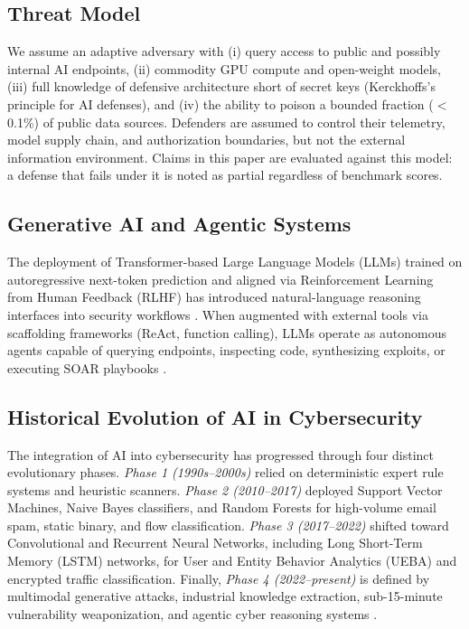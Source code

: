 \documentclass[conference,10pt,twocolumn,a4paper]{IEEEtran}
\begin{document}
\subsection{Threat Model}
We assume an adaptive adversary with (i) query access to public and possibly internal AI endpoints, (ii) commodity GPU compute and open-weight models, (iii) full knowledge of defensive architecture short of secret keys (Kerckhoffs's principle for AI defenses), and (iv) the ability to poison a bounded fraction ($<$0.1\%) of public data sources. Defenders are assumed to control their telemetry, model supply chain, and authorization boundaries, but not the external information environment. Claims in this paper are evaluated against this model: a defense that fails under it is noted as partial regardless of benchmark scores.

\subsection{Generative AI and Agentic Systems}
The deployment of Transformer-based Large Language Models (LLMs) trained on autoregressive next-token prediction and aligned via Reinforcement Learning from Human Feedback (RLHF) has introduced natural-language reasoning interfaces into security workflows \cite{enisa_frontier_2026, hines2026securing}. When augmented with external tools via scaffolding frameworks (ReAct, function calling), LLMs operate as autonomous agents capable of querying endpoints, inspecting code, synthesizing exploits, or executing SOAR playbooks \cite{fang2024llm, cisa_agentic_ai_2026}.

\subsection{Historical Evolution of AI in Cybersecurity}
The integration of AI into cybersecurity has progressed through four distinct evolutionary phases. \emph{Phase 1 (1990s--2000s)} relied on deterministic expert rule systems and heuristic scanners. \emph{Phase 2 (2010--2017)} deployed Support Vector Machines, Naive Bayes classifiers, and Random Forests for high-volume email spam, static binary, and flow classification. \emph{Phase 3 (2017--2022)} shifted toward Convolutional and Recurrent Neural Networks, including Long Short-Term Memory (LSTM) networks, for User and Entity Behavior Analytics (UEBA) and encrypted traffic classification. Finally, \emph{Phase 4 (2022--present)} is defined by multimodal generative attacks, industrial knowledge extraction, sub-15-minute vulnerability weaponization, and agentic cyber reasoning systems \cite{enisa_etl_2025, enisa_frontier_2026, crowdstrike_gtr_2025, darpa_aixcc_2025}.
\end{document}

